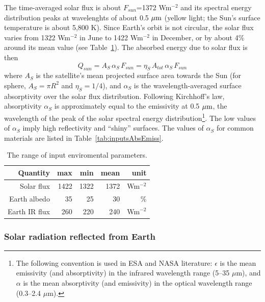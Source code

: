 \documentclass[]{aastex62}
\def\eq#1{\begin{equation} #1 \end{equation}}
\def\mic              {\hbox{$\mu\mathrm{m}$}}
\begin{document}
The time-averaged solar flux is about $F_{sun}$=1372 Wm$^{-2}$ and its spectral energy distribution peaks 
at wavelenghts of about 0.5 $\mic$ (yellow light; the Sun's surface temperature is about 5,800 K). Since 
Earth's orbit is not circular, the solar flux varies from 1322 Wm$^{-2}$ in June to 1422 Wm$^{-2}$ in December, 
or by about 4\% around its mean value (see Table~\ref{tab:inputsEnvParam}). The absorbed energy due to 
solar flux is then 
\eq{
\label{eq:Qsun}
                   Q_{sun}  = A_S \, \alpha_S  \, F_{sun} = \eta_S \, A_{tot} \, \alpha_S  \, F_{sun} 
} 
where  $A_S$ is the satellite's mean projected surface area towards the Sun (for sphere, $A_S = \pi R^2$ and
$\eta_S=1/4$), and $\alpha_S$ is the wavelength-averaged surface absorptivity over the solar flux distribution. 
Following Kirchhoff's law, absorptivity $\alpha_S$ is approximately equal to the emissivity at 0.5 $\mic$, the wavelength 
of the peak of the solar spectral energy distribution\footnote{The following convention is used in ESA and NASA 
literature: $\epsilon$ is the mean emissivity (and absorptivity) in the infrared wavelength range (5--35 \mic), 
and $\alpha$ is the mean absorptivity (and emissivity) in the optical wavelength range (0.3--2.4 \mic).}. The low 
values of $\alpha_S$ imply high reflectivity and ``shiny'' surfaces. The values of  $\alpha_S$ for common 
materials are listed in Table~\ref{tab:inputsAbsEmiss}. 
 

\begin{table}[t]
	\centering
	\caption{The range of input enviromental parameters. }
	\label{tab:inputsEnvParam}
	\begin{tabular}{r|r|r|r|r} %
		\hline
  	         Quantity & max    &   min   &  mean &  unit            \\
		\hline
              Solar flux   &  1422  &  1322  &  1372 & Wm$^{-2}$  \\
           Earth albedo  &    35    &    25    &     30  &   \%            \\ 
            Earth IR flux &  260    &   220   &    240 & Wm$^{-2}$   \\
 		\hline
	\end{tabular} 
\end{table}

\subsubsection{Solar radiation reflected from Earth} 
\end{document}
